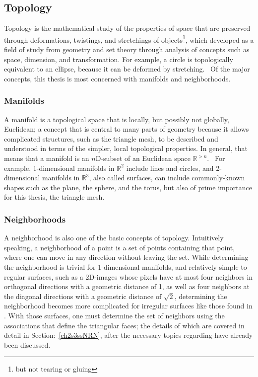 %
%
%
\subsection{Topology}
\label{ch2sBssT}
Topology is the mathematical study of the properties of space that are preserved through deformations, twistings, and stretchings of objects\footnote{but not tearing or gluing}, which developed as a field of study from geometry and set theory through analysis of concepts such as space, dimension, and transformation. For example, a circle is topologically equivalent to an ellipse, because it can be deformed by stretching.~\cite{Weisstein19c} Of the major concepts, this thesis is most concerned with manifolds and neighborhoods.

%
\subsubsection{Manifolds}
A manifold is a topological space that is locally, but possibly not globally, Euclidean; a concept that is central to many parts of geometry because it allows complicated structures, such as the triangle mesh, to be described and understood in terms of the simpler, local topological properties. In general, that means that a manifold is an $n$D-subset of an Euclidean space $\mathbb{R}^{>n}$.~\cite[p.~199]{Mara12} For example, 1-dimensional manifolds in $\mathbb{R}^{2}$ include lines and circles, and 2-dimensional manifolds in $\mathbb{R}^{3}$, also called surfaces, can include commonly-known shapes such as the plane, the sphere, and the torus, but also of prime importance for this thesis, the triangle mesh.

%
\subsubsection{Neighborhoods}
A neighborhood is also one of the basic concepts of topology. Intuitively speaking, a neighborhood of a point is a set of points containing that point, where one can move in any direction without leaving the set. While determining the neighborhood is trivial for 1-dimensional manifolds, and relatively simple to regular surfaces, such as a 2D-images whose pixels have at most four neighbors in orthogonal directions with a geometric distance of 1, as well as four neighbors at the diagonal directions with a geometric distance of $\sqrt{2}$, determining the neighborhood becomes more complicated for irregular surfaces like those found in \tdd{}. With those surfaces, one must determine the set of neighbors using the associations that define the triangular faces; the details of which are covered in detail in Section:~\ref{ch2s3ssNRN}, after the necessary topics regarding \tdd{} have already been discussed.

